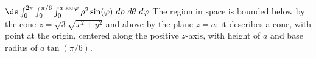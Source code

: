 {
$\ds \int_0^{2\pi}\int_{0}^{\pi/6}\int_0^{a\sec \varphi} \rho^2\sin(\varphi)\ d\rho\ d\theta\ d\varphi$
}
{The region in space is bounded below by the cone $z=\sqrt{3}\sqrt{x^2+y^2}$ and above by the plane $z=a$: it describes a cone, with point at the origin, centered along the positive $z$-axis, with height of $a$ and base radius  of $a\tan(\pi/6)$.
}
